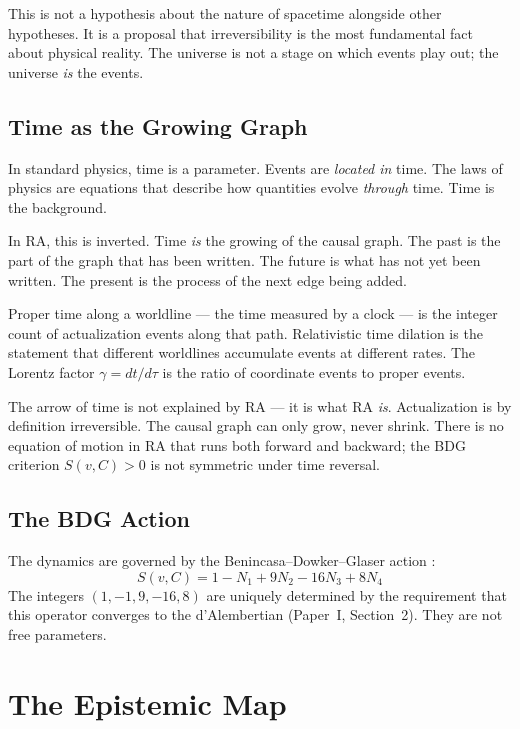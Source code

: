 \documentclass[12pt,a4paper]{article}
\begin{document}
This is not a hypothesis about the nature of spacetime alongside other hypotheses.  It is a proposal that irreversibility is the most fundamental fact about physical reality.  The universe is not a stage on which events play out; the universe \emph{is} the events.

\subsection{Time as the Growing Graph}

In standard physics, time is a parameter.  Events are \emph{located in} time.  The laws of physics are equations that describe how quantities evolve \emph{through} time.  Time is the background.

In RA, this is inverted.  Time \emph{is} the growing of the causal graph.  The past is the part of the graph that has been written.  The future is what has not yet been written.  The present is the process of the next edge being added.

Proper time along a worldline --- the time measured by a clock --- is the integer count of actualization events along that path.  Relativistic time dilation is the statement that different worldlines accumulate events at different rates.  The Lorentz factor $\gamma=dt/d\tau$ is the ratio of coordinate events to proper events.

The arrow of time is not explained by RA --- it is what RA \emph{is}.  Actualization is by definition irreversible.  The causal graph can only grow, never shrink.  There is no equation of motion in RA that runs both forward and backward; the BDG criterion $S(v,C)>0$ is not symmetric under time reversal.

\subsection{The BDG Action}

The dynamics are governed by the Benincasa--Dowker--Glaser action \cite{Dowker2013}:
\begin{equation}
  S(v,C) = 1 - N_1 + 9N_2 - 16N_3 + 8N_4
  \label{eq:BDG}
\end{equation}
The integers $(1,-1,9,-16,8)$ are uniquely determined by the requirement that this operator converges to the d'Alembertian (Paper~I, Section~2).  They are not free parameters.

\section{The Epistemic Map}\label{sec:epistemic}
\end{document}
